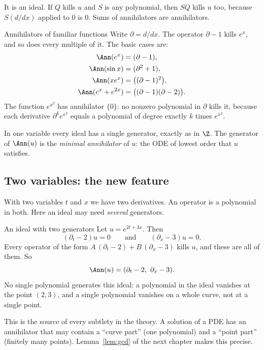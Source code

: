 It is an ideal. If $Q$ kills $u$ and $S$ is any polynomial, then $SQ$ kills $u$ too, because $S(d/dx)$ applied to $0$ is $0$. Sums of annihilators are annihilators.

\begin{example}{Annihilators of familiar functions}
Write $\partial=d/dx$. The operator $\partial-1$ kills $e^x$, and so does every multiple of it. The basic cases are:
\begin{align*}
\Ann(e^x)&=(\partial-1),\\
\Ann(\sin x)&=(\partial^2+1),\\
\Ann(xe^x)&=\big((\partial-1)^2\big),\\
\Ann(e^x+e^{2x})&=\big((\partial-1)(\partial-2)\big).
\end{align*}
The function $e^{x^2}$ has annihilator $\{0\}$: no nonzero polynomial in $\partial$ kills it, because each derivative $\partial^ke^{x^2}$ equals a polynomial of degree exactly $k$ times $e^{x^2}$.
\end{example}

In one variable every ideal has a single generator, exactly as in $\Z$. The generator of $\Ann(u)$ is the \emph{minimal annihilator} of $u$: the ODE of lowest order that $u$ satisfies.

\subsection{Two variables: the new feature}

With two variables $t$ and $x$ we have two derivatives. An operator is a polynomial in both. Here an ideal may need \emph{several} generators.

\begin{example}{An ideal with two generators}
Let $u=e^{2t+3x}$. Then
\[
(\partial_t-2)u=0\qquad\text{and}\qquad(\partial_x-3)u=0 .
\]
Every operator of the form $A\,(\partial_t-2)+B\,(\partial_x-3)$ kills $u$, and these are all of them. So
\[
\Ann(u)=(\partial_t-2,\ \partial_x-3).
\]
No single polynomial generates this ideal: a polynomial in the ideal vanishes at the point $(2,3)$, and a single polynomial vanishes on a whole curve, not at a single point.
\end{example}

This is the source of every subtlety in the theory. A solution of a PDE has an annihilator that may contain a ``curve part'' (one polynomial) and a ``point part'' (finitely many points). Lemma~\ref{lem:gcd} of the next chapter makes this precise.

